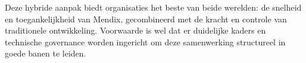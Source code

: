 Deze hybride aanpak biedt organisaties het beste van beide werelden: de snelheid en toegankelijkheid van Mendix, gecombineerd met de kracht en controle van traditionele ontwikkeling. Voorwaarde is wel dat er duidelijke kaders en technische governance worden ingericht om deze samenwerking structureel in goede banen te leiden.



